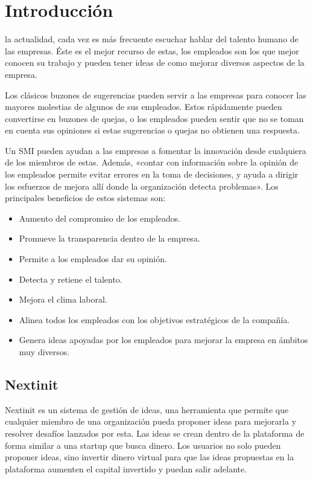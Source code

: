 \chapter{Introducción}

 la actualidad, cada vez es más frecuente escuchar hablar del talento humano de las empresas. Éste es el mejor recurso de estas,
 los empleados son los que mejor conocen su trabajo y pueden tener ideas de como mejorar diversos aspectos de la empresa. 
 
 Los clásicos buzones de sugerencias pueden servir a las empresas para conocer las mayores molestias de algunos de sus empleados. Estos 
 rápidamente pueden convertirse en buzones de quejas, o los empleados pueden sentir que no se toman en cuenta sus opiniones si estas 
 sugerencias o quejas no obtienen una respuesta.
 
 Un \acf{SMI} pueden ayudan a las empresas a fomentar la innovación desde cualquiera de los miembros de 
 estas. Además, «contar con información sobre la opinión de los empleados permite evitar errores en la toma de decisiones, y 
 ayuda a dirigir los esfuerzos de mejora allí donde la organización detecta problemas»\cite{talento}. Los principales beneficios de estos sistemas son:
 
 \begin{itemize}
 	\item Aumento del compromiso de los empleados.
 	\item Promueve la transparencia dentro de la empresa.
 	\item Permite a los empleados dar su opinión.
 	\item Detecta y retiene el talento.
 	\item Mejora el clima laboral.
 	\item Alinea todos los empleados con los objetivos estratégicos de la compañía.
 	\item Genera ideas apoyadas por los empleados para mejorar la empresa en ámbitos muy diversos.
 \end{itemize}
 
 
 \section{Nextinit}
 
 Nextinit es un sistema de gestión de ideas, una herramienta que permite que cualquier miembro de una organización pueda proponer ideas para
 mejorarla y resolver desafíos lanzados por esta. Las ideas se crean dentro de la plataforma de forma similar a una startup que busca dinero. Los 
 usuarios no solo pueden  proponer ideas, sino invertir dinero virtual para que las ideas propuestas en la plataforma aumenten el capital invertido 
 y puedan salir adelante.
 
